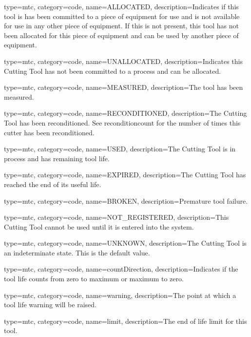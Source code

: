 {
  type=mtc,
  category=code,
  name={ALLOCATED},
  description={Indicates if this tool is has been committed to a piece of equipment for use and is not available for use in any other piece of equipment. If this is not present, this tool has not been allocated for this piece of equipment and can be used by another piece of equipment.}
}


{
  type=mtc,
  category=code,
  name={UNALLOCATED},
  description={Indicates this Cutting Tool has not been committed to a process and can be allocated.}
}


{
  type=mtc,
  category=code,
  name={MEASURED},
  description={The tool has been measured.}
}


{
  type=mtc,
  category=code,
  name={RECONDITIONED},
  description={The Cutting Tool has been reconditioned. See \gls{reconditioncount} for the number of times this cutter has been reconditioned.}
}


{
  type=mtc,
  category=code,
  name={USED},
  description={The Cutting Tool is in process and has remaining tool life.}
}


{
  type=mtc,
  category=code,
  name={EXPIRED},
  description={The Cutting Tool has reached the end of its useful life.}
}


{
  type=mtc,
  category=code,
  name={BROKEN},
  description={Premature tool failure.}
}


{
  type=mtc,
  category=code,
  name={NOT\_REGISTERED},
  description={This Cutting Tool cannot be used until it is entered into the system.}
}


{
  type=mtc,
  category=code,
  name={UNKNOWN},
  description={The Cutting Tool is an indeterminate state. This is the default value.}
}


{
  type=mtc,
  category=code,
  name={countDirection},
  description={Indicates if the tool life counts from zero to maximum or maximum to zero.}
}


{
  type=mtc,
  category=code,
  name={warning},
  description={The point at which a tool life warning will be raised.}
}


{
  type=mtc,
  category=code,
  name={limit},
  description={The end of life limit for this tool.}
}



